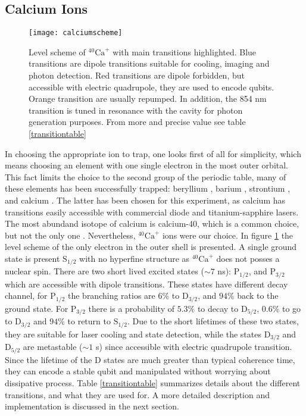 \subsection{Calcium Ions}
\label{sec:calciumion}
\begin{figure}
\centering
\texttt{[image: calciumscheme]}
\caption{Level scheme of $^{40}\text{Ca}^+$ with main transitions highlighted. Blue transitions are dipole transitions suitable for cooling, imaging and photon detection. Red transitions are dipole forbidden, but accessible with electric quadrupole, they are used to encode qubits. Orange transition are usually repumped. In addition, the 854 nm transition is tuned in resonance with the cavity for photon generation purposes. From more and precise value see table \ref{transitiontable}}
\label{calciumscheme}
\end{figure}
In choosing the appropriate ion to trap, one looks first of all for simplicity, which means choosing an element with one single electron in the most outer orbital.
This fact limits the choice to the second group of the periodic table, many of these elements has been successfully trapped: beryllium \cite{beryllium}, barium \cite{barium}, strontium \cite{strontium}, and calcium \cite{calcium}.
The latter has been chosen for this experiment, as calcium has transitions easily accessible with commercial diode and titanium-sapphire lasers. The most abundand isotope of calcium is calcium-40, which is a common choice, but not the only one \cite{Tanaka2007}. Nevertheless, $^{40}\text{Ca}^+$ ions were our choice. In figure \ref{calciumscheme} the level scheme of the only electron in the outer shell is presented. A single ground state is present $\text{S}_{1/2}$ with no hyperfine structure as $^{40}\text{Ca}^+$ does not posses a nuclear spin. There are two short lived excited states ($\sim 7$ ns): $\text{P}_{1/2}$, and $\text{P}_{3/2}$ which are accessible with dipole transitions. These states have different decay channel, for $\text{P}_{1/2}$
the branching ratios are $6\%$ to $\text{D}_{3/2}$, and $94\%$ back to the ground state. For  $\text{P}_{3/2}$ there is a probability of $5.3\%$ to decay to   $\text{D}_{5/2}$, $0.6\%$ to go to  $\text{D}_{3/2}$ and $94\%$ to return to  $\text{S}_{1/2}$. Due to the short lifetimes of these two states, they are suitable for laser cooling and state detection, while the states $\text{D}_{3/2}$ and $\text{D}_{5/2}$
are metastable ($\sim 1$ s) since accessible with electric quadrupole transition. Since the lifetime of the D states are much greater than typical coherence time, they can encode a stable qubit and manipulated without worrying about dissipative process. Table \ref{transitiontable} summarizes details about the different transitions, and what they are used for. A more detailed description and implementation is discussed in the next section.

